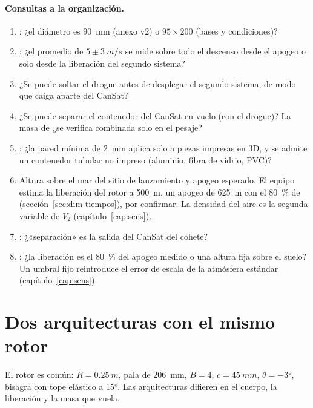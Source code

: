 \paragraph{Consultas a la organización.}
\begin{enumerate}[leftmargin=*]
  \item {}: ¿el diámetro es \SI{90}{mm} (anexo v2) o $95\times200$ (bases y condiciones)?
  \item {}: ¿el promedio de $5\pm\SI{3}{m/s}$ se mide sobre todo el descenso desde el
        apogeo o solo desde la liberación del segundo sistema?
  \item ¿Se puede soltar el drogue antes de desplegar el segundo sistema, de modo que caiga
        aparte del CanSat?
  \item ¿Se puede separar el contenedor del CanSat en vuelo (con el drogue)? La masa de
         ¿se verifica combinada solo en el pesaje?
  \item {}: ¿la pared mínima de \SI{2}{mm} aplica solo a piezas impresas en 3D, y se
        admite un contenedor tubular no impreso (aluminio, fibra de vidrio, PVC)?
  \item Altura sobre el mar del sitio de lanzamiento y apogeo esperado. El equipo estima la
        liberación del rotor a \SI{500}{m}, un apogeo de \SI{625}{m} con el \SI{80}{\percent} de
         (sección~\ref{sec:dim-tiempos}), por confirmar. La densidad del aire es la
        segunda variable de $V_2$ (capítulo~\ref{cap:sens}).
  \item {}: ¿«separación» es la salida del CanSat del cohete?
  \item {}: ¿la liberación es el \SI{80}{\percent} del apogeo medido o una altura fija sobre
        el suelo? Un umbral fijo reintroduce el error de escala de la atmósfera estándar
        (capítulo~\ref{cap:sens}).
\end{enumerate}

\section{Dos arquitecturas con el mismo rotor}\label{sec:arq-dos}

El rotor es común: $R=\SI{0.25}{m}$, pala de \SI{206}{mm}, $B=4$, $c=\SI{45}{mm}$,
$\theta=\ang{-3}$, bisagra con tope elástico a \ang{+15}. Las arquitecturas difieren en el
cuerpo, la liberación y la masa que vuela.

